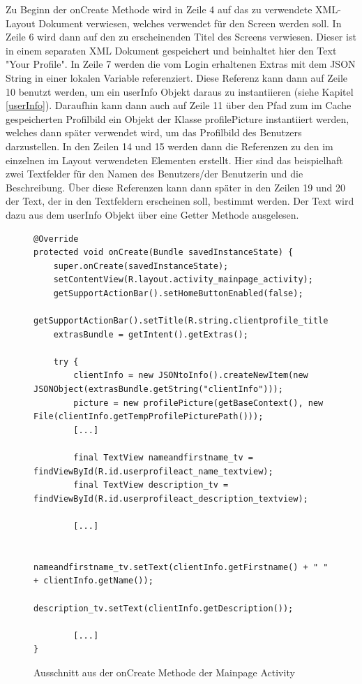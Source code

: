 \documentclass[a4paper,11pt]{report}
\begin{document}
			Zu Beginn der onCreate Methode wird in Zeile 4 auf das zu verwendete XML-Layout Dokument verwiesen, welches verwendet für den Screen werden soll. In Zeile 6 wird dann auf den zu erscheinenden Titel des Screens verwiesen. Dieser ist in einem separaten XML Dokument gespeichert und beinhaltet hier den Text "Your Profile". In Zeile 7 werden die vom Login erhaltenen Extras mit dem JSON String in einer lokalen Variable referenziert. Diese Referenz kann dann auf Zeile 10 benutzt werden, um ein userInfo Objekt daraus zu instantiieren (siehe Kapitel \ref{userInfo}). Daraufhin kann dann auch auf Zeile 11 über den Pfad zum im Cache gespeicherten Profilbild ein Objekt der Klasse profilePicture instantiiert werden, welches dann später verwendet wird, um das Profilbild des Benutzers darzustellen. In den Zeilen 14 und 15 werden dann die Referenzen zu den im einzelnen im Layout verwendeten Elementen erstellt. Hier sind das beispielhaft zwei Textfelder für den Namen des Benutzers/der Benutzerin und die Beschreibung. Über diese Referenzen kann dann später in den Zeilen 19 und 20 der Text, der in den Textfeldern erscheinen soll, bestimmt werden. Der Text wird dazu aus dem userInfo Objekt über eine Getter Methode ausgelesen. 
\begin{figure}
	\begin{center}
		\begin{verbatim}
@Override
protected void onCreate(Bundle savedInstanceState) {
	super.onCreate(savedInstanceState);
	setContentView(R.layout.activity_mainpage_activity);
	getSupportActionBar().setHomeButtonEnabled(false);
	getSupportActionBar().setTitle(R.string.clientprofile_title);
	extrasBundle = getIntent().getExtras();
	
	try {
		clientInfo = new JSONtoInfo().createNewItem(new JSONObject(extrasBundle.getString("clientInfo")));
		picture = new profilePicture(getBaseContext(), new File(clientInfo.getTempProfilePicturePath()));
		[...]
	
		final TextView nameandfirstname_tv = findViewById(R.id.userprofileact_name_textview);
		final TextView description_tv = findViewById(R.id.userprofileact_description_textview);
	
		[...]
	
		nameandfirstname_tv.setText(clientInfo.getFirstname() + " " + clientInfo.getName());
		description_tv.setText(clientInfo.getDescription());
	
		[...]
}
		\end{verbatim}
	\caption{Ausschnitt aus der onCreate Methode der Mainpage Activity}\label{java:onCreate}
	\end{center}

\end{figure}
		
\end{document}
